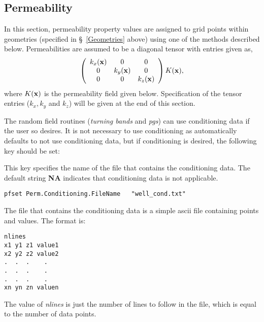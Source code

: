 
\subsection{Permeability}
\label{Permeability}

In this section, permeability property values are assigned to grid
points within geometries (specified in \S~\ref{Geometries} above)
using one of the methods described below.  Permeabilities are assumed to be a
diagonal tensor with entries given as,
\[
\left(
\begin{array}{ccc}
k_x({\bf x}) & 0 & 0 \\
0 & k_y({\bf x}) & 0 \\
0 & 0 & k_z({\bf x})
\end{array} \right)
K({\bf x}),
\]
where $K({\bf x})$ is the permeability field given below.  Specification of the
tensor entries ($k_x, k_y$ and $k_z$) will be given at the end of this section.

The random field routines ({\em turning bands} and {\em pgs}) can use
conditioning data if the user so desires.  It is not necessary to use
conditioning as
\parflow{} automatically defaults to not use conditioning data, but
if conditioning is desired, the following key should be set:

{
This key specifies the name of the file that contains the conditioning
data.  The default string {\bf NA} indicates that conditioning data is
not applicable.
}
\begin{display}\begin{verbatim}
pfset Perm.Conditioning.FileName   "well_cond.txt"
\end{verbatim}\end{display}

The file that contains the conditioning data is a simple ascii file
containing points and values. The format is:

\begin{display}\begin{verbatim}
nlines
x1 y1 z1 value1
x2 y2 z2 value2
.  .  .    .
.  .  .    .
.  .  .    .
xn yn zn valuen
\end{verbatim}\end{display}

The value of {\em nlines} is just the number
of lines to follow in the file, which
is equal to the number of data points.

